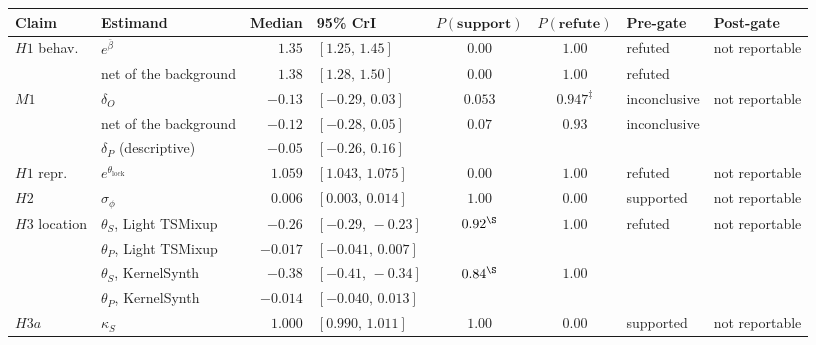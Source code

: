 \begin{table}[!tbp]
    \centering
    \footnotesize
    \setlength{\tabcolsep}{4pt}
    \renewcommand{\arraystretch}{1.15}
    \begin{tabular}{@{}llrlccll@{}}
        \toprule
        \textbf{Claim} & \textbf{Estimand} & \textbf{Median} & \textbf{95\% CrI} & {\boldmath$P(\textbf{support})$} & {\boldmath$P(\textbf{refute})$} & \textbf{Pre-gate} & \textbf{Post-gate} \\
        \midrule
        \multirow{2}{*}{$H1$ behav.} & $e^{\bar\beta}$ & $1.35$ & $[1.25,\,1.45]$ & $0.00$ & $1.00$ & refuted & \multirow{2}{*}{not reportable} \\
        \cmidrule[0.1pt]{2-7}
        & \quad net of the background & $1.38$ & $[1.28,\,1.50]$ & $0.00$ & $1.00$ & refuted & \\
        \midrule
        \multirow{3}{*}{$M1$} & $\delta_O$ & $-0.13$ & $[-0.29,\,0.03]$ & $0.053$ & $0.947^{\ddagger}$ & inconclusive & \multirow{2}{*}{not reportable} \\
        \cmidrule[0.1pt]{2-7}
        & \quad net of the background & $-0.12$ & $[-0.28,\,0.05]$ & $0.07$ & $0.93$ & inconclusive & \\
        \cmidrule[0.1pt]{2-8}
        & $\delta_P$ (descriptive) & $-0.05$ & $[-0.26,\,0.16]$ & \textendash{} & \textendash{} & \textendash{} & \textendash{} \\
        \midrule
        $H1$ repr. & $e^{\theta_{\mathrm{lock}}}$ & $1.059$ & $[1.043,\,1.075]$ & $0.00$ & $1.00$ & refuted & not reportable \\
        \midrule
        $H2$ & $\sigma_\phi$ & $0.006$ & $[0.003,\,0.014]$ & $1.00$ & $0.00$ & supported & not reportable \\
        \midrule
        \multirow{4}{*}{$H3$ location} & $\theta_S$, Light TSMixup & $-0.26$ & $[-0.29,\,-0.23]$ & \multirow{2}{*}{$0.92^{\S}$} & \multirow{2}{*}{$1.00$} & \multirow{4}{*}{refuted} & \multirow{4}{*}{not reportable} \\
        \cmidrule[0.1pt]{2-4}
        & $\theta_P$, Light TSMixup & $-0.017$ & $[-0.041,\,0.007]$ & & & & \\
        \cmidrule[0.1pt]{2-6}
        & $\theta_S$, KernelSynth & $-0.38$ & $[-0.41,\,-0.34]$ & \multirow{2}{*}{$0.84^{\S}$} & \multirow{2}{*}{$1.00$} & & \\
        \cmidrule[0.1pt]{2-4}
        & $\theta_P$, KernelSynth & $-0.014$ & $[-0.040,\,0.013]$ & & & & \\
        \midrule
        $H3a$ & $\kappa_S$ & $1.000$ & $[0.990,\,1.011]$ & $1.00$ & $0.00$ & supported & not reportable \\

\end{tabular}
\end{table}
